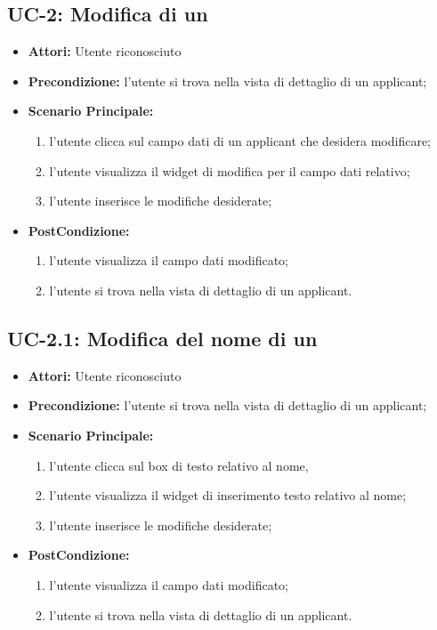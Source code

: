 \subsection{UC-2: Modifica di un \applicant}
\begin{itemize}
	\item \textbf{Attori:} Utente riconosciuto
	\item \textbf{Precondizione:}  l'utente si trova nella vista di dettaglio di un applicant;
	\item \textbf{Scenario Principale:}
	\begin{enumerate}
		\item l'utente clicca sul campo dati di un applicant che desidera modificare;
		\item l'utente visualizza il  widget di modifica per il campo dati
		relativo;
		\item l'utente inserisce le modifiche desiderate;
	\end{enumerate}
	\item \textbf{PostCondizione:} 
	\begin{enumerate}
		\item l'utente visualizza il campo dati modificato;
		\item l'utente si trova nella vista di dettaglio di un applicant.
	\end{enumerate}
	
\end{itemize}

\subsection{UC-2.1: Modifica del nome di un \applicant}
\begin{itemize}
	\item \textbf{Attori:} Utente riconosciuto
	\item \textbf{Precondizione:}  l'utente si trova nella vista di dettaglio di un applicant;
	\item \textbf{Scenario Principale:}
	\begin{enumerate}
		\item l'utente clicca sul box di testo relativo al nome,
		\item l'utente visualizza il  widget di inserimento testo relativo al nome;
		\item l'utente inserisce le modifiche desiderate;
	\end{enumerate}
	\item \textbf{PostCondizione:} 
	\begin{enumerate}
		\item l'utente visualizza il campo dati modificato;
		\item l'utente si trova nella vista di dettaglio di un applicant.
	\end{enumerate}
	
\end{itemize}

